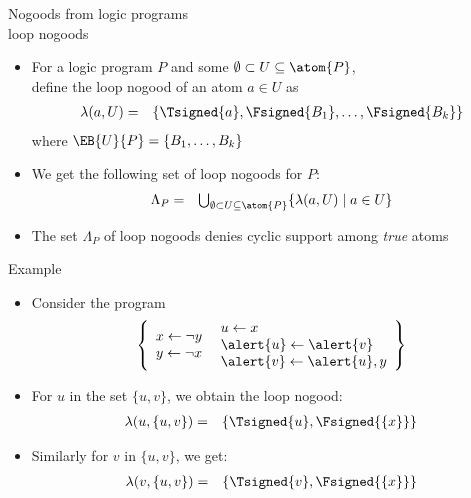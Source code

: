 \begin{frame}{Nogoods from logic programs\\[-1ex]\normalsize loop nogoods} %
  \begin{itemize}
  \item<1->
    For a logic program $P$ and some $\emptyset \subset U\subseteq\atom{P}$,\\
    define the \alert{loop nogood} of an atom $a\in U$ as
    \begin{eqnarray*}
      \lambda(a,U)
      & = &
      \{\Tsigned{a},\Fsigned{B_1},\dots,\Fsigned{B_k}\}
    \end{eqnarray*}
    where $\EB{U}{P}=\{B_1,\dots,B_k\}$
    \medskip
  \item<2->
    We get the following set of loop nogoods for $P$:
    \begin{eqnarray*}
      \Lambda_P
      & = &
      \textstyle
      \bigcup_{\emptyset\subset U\subseteq \atom{P}}
      \{
      \lambda(a,U)
      \mid
      a\in U
      \}
    \end{eqnarray*}
  \item<3->  The set $\Lambda_P$ of loop nogoods denies cyclic
    support among \emph{true} atoms
  \end{itemize}
\end{frame}
\begin{frame}{Example}
  \begin{itemize}
  \item<1-> Consider the program
    \[
    \left\{
      \begin{array}{l}
        x  \leftarrow  \neg y\\
        y  \leftarrow  \neg x
      \end{array}
      \
      \begin{array}{l}
        u  \leftarrow  x\\
        \alert{u}  \leftarrow  \alert{v}\\
        \alert{v}  \leftarrow  \alert{u}, y
      \end{array}
    \right\}
    \]
  \item<2-> For $u$ in the set $\{u,v\}$, we obtain the loop nogood:
    \begin{eqnarray*}
      \lambda(u,\{u,v\}) &=& \{\Tsigned{u},\Fsigned{\{x\}}\}
    \end{eqnarray*}
  \item<3-> [] Similarly for $v$ in $\{u,v\}$, we get:
    \begin{eqnarray*}
      \lambda(v,\{u,v\}) &=& \{\Tsigned{v},\Fsigned{\{x\}}\}
    \end{eqnarray*}
  \end{itemize}
\end{frame}
